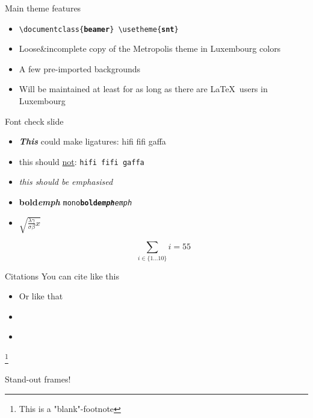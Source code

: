 \documentclass[aspectratio=169]{beamer}
\newcommand\blfootnote[1]{%
  \begingroup
  \renewcommand\thefootnote{}\footnote{#1}%
  \addtocounter{footnote}{-1}%
  \endgroup
}
\newcommand\forward[1]{\textcolor{sntpurple}{{\textbf{\textit{#1}}}}}
\begin{document}
\begin{frame}{Main theme features}
\begin{itemize}
\item \texttt{\textbackslash documentclass\{\textbf{beamer}\} \textbackslash usetheme\{\textbf{snt}\}}
\item Loose\&incomplete copy of the Metropolis theme in Luxembourg colors
\item A few pre-imported backgrounds
\item Will be maintained at least for as long as there are \LaTeX\ users in Luxembourg
\end{itemize}

\end{frame}

\begin{frame}{Font check slide}
\begin{itemize}
\item \forward{This} could make ligatures: hifi fifi gaffa
\item this should \underline{not}: \texttt{hifi fifi gaffa}
\item \emph{this should be emphasised}
\item \textbf{bold\emph{emph}} \texttt{mono\textbf{bold\emph{emph}}\emph{emph}}
\item \(\sqrt{\frac{\lambda\gamma}{\sigma\beta}x}\)

\[ \sum_{i\in\{1\dots 10\}} i = 55 \]
\end{itemize}
\end{frame}

\begin{frame}{Citations}
You can cite \citep{Burt1983TheLP} like this
\begin{itemize}
    \item Or like that
    \item \cite{Ma2018InfraredAV}
    \item \citet{Burt1983TheLP}
\end{itemize}
\blfootnote{This is a "blank"-footnote}
\end{frame}

\begin{frame}[standout]
Stand-out frames!
\vfill
{}
\end{frame}
\end{document}
